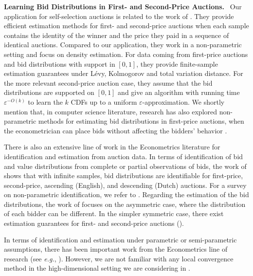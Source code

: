 \documentclass[11pt,letterpaper]{article}
\theoremstyle{plain}
\theoremstyle{definition}
\theoremstyle{remark}
\newcommand{\eps}{\varepsilon}
\renewcommand{\paragraph}[1]{\medskip \noindent\textbf{#1}~}
\newcommand{\eg}{\emph{e.g.}}
\begin{document}
{\paragraph{Learning Bid Distributions in First- and Second-Price Auctions.} 
Our application for self-selection auctions is related to the work of
\citet{cherapanamjeri2022auctionEstimation}. They provide efficient estimation methods for first- and second-price auctions when 
each sample contains the identity of the winner and the price they paid in a sequence of identical
auctions.
Compared to our application, they work in a non-parametric setting and focus on density estimation.
For data coming from first-price auctions and bid distributions with support in $[0,1]$, they provide finite-sample estimation guarantees under
Lévy, Kolmogorov and total variation distance. For the more relevant second-price auction case, they assume that the bid distributions are supported on $[0,1]$ and give an algorithm with running time $\eps^{-O(k)}$ to learn the $k$ CDFs up to a uniform $\eps$-approximation. We shortly mention that, in computer science literature, research has also explored non-parametric methods for estimating bid distributions in first-price auctions, when the econometrician can place bids without affecting the bidders' behavior \cite{blum2015learning}.

There is also an extensive line of work in the Econometrics literature for identification and estimation from auction data. In terms of identification of bid and value distributions from complete or partial observations of bids, the work of \citet{athey2002identification}
shows that with infinite samples, bid distributions are identifiable
for first-price, second-price, ascending (English), and descending (Dutch) auctions. For a survey on non-parametric identification, we refer to \citet{athey2007nonparametric}. Regarding the estimation of the bid distributions, the work of \cite{cherapanamjeri2022auctionEstimation} focuses on the asymmetric case, where the distribution of each bidder can be different. In the simpler symmetric case, there exist estimation guarantees for first- and second-price auctions (\cite{morganti2011estimating,menzel2013large}).

In terms of identification and estimation under parametric or semi-parametric assumptions, there has been important work from the Econometrics line of research (see \eg{}, \cite{athey2006empirical,donald1996identification,athey2011comparing,hendricks2003empirical}). However, we are not familiar with any local convergence method in the high-dimensional setting we are considering in .

}
\end{document}
